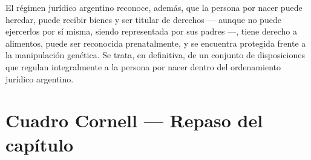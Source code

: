\documentclass[12pt,oneside]{book}
\begin{document}
El régimen jurídico argentino reconoce, además, que la persona por nacer puede heredar, puede recibir bienes y ser titular de derechos --- aunque no puede ejercerlos por sí misma, siendo representada por sus padres ---, tiene derecho a alimentos, puede ser reconocida prenatalmente, y se encuentra protegida frente a la manipulación genética. Se trata, en definitiva, de un conjunto de disposiciones que regulan integralmente a la persona por nacer dentro del ordenamiento jurídico argentino.


\section*{Cuadro Cornell --- Repaso del capítulo}
\end{document}
